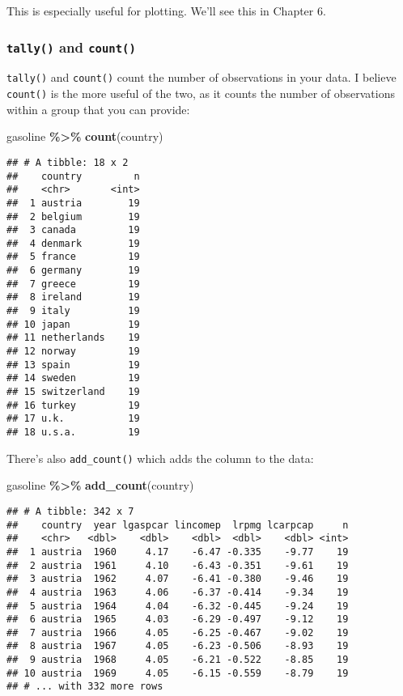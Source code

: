 \documentclass[
]{article}
\newenvironment{Shaded}{\begin{snugshade}}{\end{snugshade}}
\newcommand{\KeywordTok}[1]{\textcolor[rgb]{0.13,0.29,0.53}{\textbf{#1}}}
\newcommand{\NormalTok}[1]{#1}
\newcommand{\OperatorTok}[1]{\textcolor[rgb]{0.81,0.36,0.00}{\textbf{#1}}}
\newcommand{\StringTok}[1]{\textcolor[rgb]{0.31,0.60,0.02}{#1}}
\begin{document}
This is especially useful for plotting. We'll see this in Chapter 6.

\hypertarget{tally-and-count}{%
\subsubsection{\texorpdfstring{\texttt{tally()} and \texttt{count()}}{tally() and count()}}\label{tally-and-count}}

\texttt{tally()} and \texttt{count()} count the number of observations in your data. I believe \texttt{count()} is the
more useful of the two, as it counts the number of observations within a group that you can provide:

\begin{Shaded}
\begin{Highlighting}[]
\NormalTok{gasoline }\OperatorTok{\%\textgreater{}\%}
\StringTok{  }\KeywordTok{count}\NormalTok{(country)}
\end{Highlighting}
\end{Shaded}

\begin{verbatim}
## # A tibble: 18 x 2
##    country         n
##    <chr>       <int>
##  1 austria        19
##  2 belgium        19
##  3 canada         19
##  4 denmark        19
##  5 france         19
##  6 germany        19
##  7 greece         19
##  8 ireland        19
##  9 italy          19
## 10 japan          19
## 11 netherlands    19
## 12 norway         19
## 13 spain          19
## 14 sweden         19
## 15 switzerland    19
## 16 turkey         19
## 17 u.k.           19
## 18 u.s.a.         19
\end{verbatim}

There's also \texttt{add\_count()} which adds the column to the data:

\begin{Shaded}
\begin{Highlighting}[]
\NormalTok{gasoline }\OperatorTok{\%\textgreater{}\%}
\StringTok{  }\KeywordTok{add\_count}\NormalTok{(country)}
\end{Highlighting}
\end{Shaded}

\begin{verbatim}
## # A tibble: 342 x 7
##    country  year lgaspcar lincomep  lrpmg lcarpcap     n
##    <chr>   <dbl>    <dbl>    <dbl>  <dbl>    <dbl> <int>
##  1 austria  1960     4.17    -6.47 -0.335    -9.77    19
##  2 austria  1961     4.10    -6.43 -0.351    -9.61    19
##  3 austria  1962     4.07    -6.41 -0.380    -9.46    19
##  4 austria  1963     4.06    -6.37 -0.414    -9.34    19
##  5 austria  1964     4.04    -6.32 -0.445    -9.24    19
##  6 austria  1965     4.03    -6.29 -0.497    -9.12    19
##  7 austria  1966     4.05    -6.25 -0.467    -9.02    19
##  8 austria  1967     4.05    -6.23 -0.506    -8.93    19
##  9 austria  1968     4.05    -6.21 -0.522    -8.85    19
## 10 austria  1969     4.05    -6.15 -0.559    -8.79    19
## # ... with 332 more rows
\end{verbatim}
\end{document}

